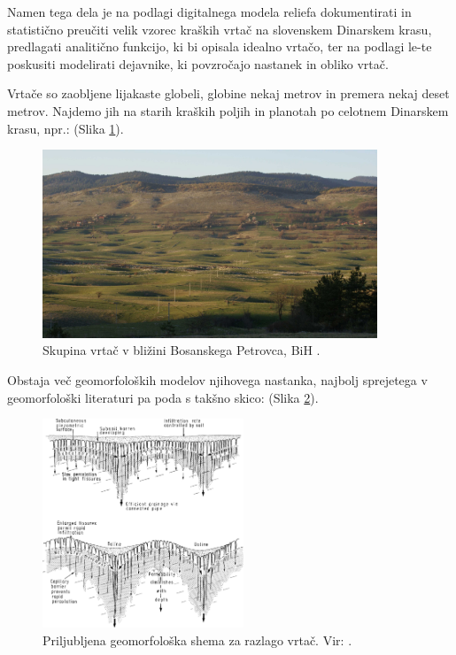 \documentclass[a4paper, twoside, 12pt]{book}
\begin{document}
  Namen tega dela je na podlagi digitalnega modela reliefa dokumentirati in statistično preučiti velik vzorec kraških vrtač na slovenskem Dinarskem krasu, predlagati analitično funkcijo, ki bi opisala idealno vrtačo, ter na podlagi le-te poskusiti modelirati dejavnike, ki povzročajo nastanek in obliko vrtač.

Vrtače so zaobljene lijakaste globeli, globine nekaj metrov in premera nekaj deset metrov. Najdemo jih na starih kraških poljih in planotah po celotnem Dinarskem krasu, npr.: (Slika \ref{fig:vrtace-bpetrovac}). 

  \begin{figure}[h]
    \begin{center}
      \includegraphics[width=10cm]{slike/bpetrovac}
    \end{center}
    \caption{Skupina vrtač v bližini Bosanskega Petrovca, BiH \cite{bpetrovac}.}
    \label{fig:vrtace-bpetrovac}
  \end{figure}

Obstaja več geomorfoloških modelov njihovega nastanka, najbolj sprejetega v geomorfološki literaturi pa \cite{ford2007karst} poda s takšno skico: (Slika \ref{fig:vrtaca-ford-williams}).

  \begin{figure}[h]
    \begin{center}
      \includegraphics[width=6cm]{slike/vrtaca-ford-williams}
    \end{center}
    \caption{Priljubljena geomorfološka shema za razlago vrtač. Vir: \cite{ford2007karst}.}
    \label{fig:vrtaca-ford-williams}
  \end{figure}
\end{document}
